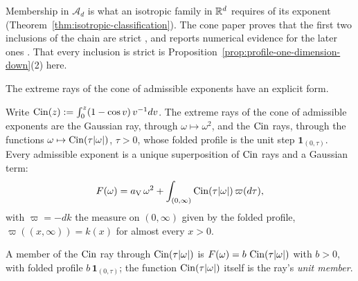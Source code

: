 Membership in $\mathcal{A}_d$ is what an isotropic family in $\mathbb{R}^d$ requires of its exponent
(Theorem~\ref{thm:isotropic-classification}).
The cone paper proves that the first two inclusions of the chain are strict
, and reports numerical evidence for the later ones .
That every inclusion is strict is Proposition~\ref{prop:profile-one-dimension-down}(2) here.

The extreme rays of the cone of admissible exponents have an explicit form.

\begin{proposition}\label{prop:line-extreme-rays}
Write $\operatorname{Cin}(z) := \int_0^z (1 - \cos v)\,v^{-1}dv$. The extreme rays of the cone of admissible
exponents are the Gaussian ray, through $\omega \mapsto \omega^2$, and the $\operatorname{Cin}$ rays, through
the functions $\omega \mapsto \operatorname{Cin}(\tau|\omega|)$, $\tau > 0$, whose folded profile is the unit
step $\mathbf{1}_{(0,\tau)}$. Every admissible exponent is a unique superposition of $\operatorname{Cin}$ rays and
a Gaussian term:
\[
  F(\omega) = a_{\mathrm V}\,\omega^2 + \int_{(0,\infty)}\operatorname{Cin}(\tau|\omega|)\,\varpi(d\tau) ,
\]
with $\varpi = -dk$ the measure on $(0,\infty)$ given by the folded profile,
$\varpi((x,\infty)) = k(x)$ for almost every $x > 0$.
\end{proposition}

A member of the $\operatorname{Cin}$ ray through $\operatorname{Cin}(\tau|\omega|)$ is $F(\omega) = b\,\operatorname{Cin}(\tau|\omega|)$ with
$b > 0$, with folded profile $b\,\mathbf{1}_{(0,\tau)}$; the function $\operatorname{Cin}(\tau|\omega|)$ itself is
the ray's \emph{unit member}.

